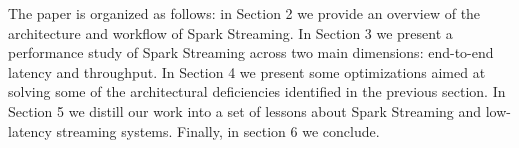 The paper is organized as follows: 
in Section 2 we provide an overview of the architecture and workflow of Spark Streaming. 
In Section 3 we present a performance study of Spark Streaming across two main dimensions: end-to-end latency and throughput.
In Section 4 we present some optimizations aimed at solving some of the architectural deficiencies identified in the previous section.
In Section 5 we distill our work into a set of lessons about Spark Streaming and low-latency streaming systems.
Finally, in section 6 we conclude.
